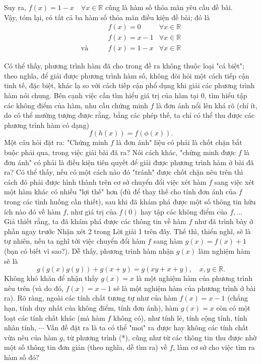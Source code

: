 \begin{bt}
{\begin{itemize}
			Suy ra, $f(x)=1-x \quad \forall x \in \mathbb{R}$ cũng là hàm số thỏa mãn yêu cầu đề bài.\\
			Vậy, tóm lại, có tất cả ba hàm số thỏa mãn điều kiện đề bài; đó là
			\begin{align*}
				&f(x)=0 &\forall x \in \mathbb{R} \\ 
				&f(x)=x-1 &\forall x \in \mathbb{R} \\ 
				\text{và}\qquad &f(x)=1-x &\forall x \in \mathbb{R}
			\end{align*}
		\end{itemize}
		Có thể thấy, phương trình hàm đã cho trong đề ra không thuộc loại "cá biệt"; theo nghĩa, để giải được phương trình hàm số, không đòi hỏi một cách tiếp cận tinh tế, đặc biệt, khác lạ so với cách tiếp cận phổ dụng khi giải các phương trình hàm nói chung. Bên cạnh việc cần tìm hiểu giá trị của hàm tại $0$, tìm hiểu tập các không điểm của hàm, nhu cầu chứng minh $f$ là đơn ánh nổi lên khá rõ (chí ít, do có thể mường tượng được rằng, bằng các phép thế, ta chỉ có thể thu được các phương trình hàm có dạng)
		$$ f(h(x))=f(\phi (x)).$$
		Một câu hỏi đặt ra: "Chứng minh $f$ là đơn ánh" liệu có phải là chốt chặn bắt buộc phải qua, trong việc giải bài đã ra? Nói cách khác, "chứng minh được $f$ là đơn ánh" có phải là điều kiện tiên quyết để giải được phương trình hàm ở bài đã ra?
		Có thể thấy, nếu có một cách nào đó "tránh" được chốt chặn nêu trên thì cách đó phải được hình thành trên cơ sở chuyển đổi việc xét hàm $f$ sang việc xét một hàm khác có nhiều "lợi thế" hơn (đủ để thay thế cho tính đơn ánh của $f$ trong các tình huống cần thiết), sau khi đã khám phá được một số thông tin hữu ích nào đó về hàm $f$, như giá trị của $f(0)$ hay tập các không điểm của $f, \ldots$\\
		Giả thiết rằng, ta đã khám phá được các thông tin về hàm $f$ như đã trình bày ở phần ngay trước Nhận xét 2 trong Lời giải 1 trên đây. Thế thì, thiển nghĩ, sẽ là tự nhiên, nếu ta nghĩ tới việc chuyển đổi hàm $f$ sang hàm $g(x)=f(x)+1$ (bạn có biết vì sao?). Dễ thấy, phương trình hàm nhận $g(x)$ làm nghiệm hàm sẽ là
		$$ g(g(x)g(y))+g(x+y)=g(xy+x+y),  \quad x,y \in \mathbb{R}. $$
		Không khó khăn để nhận thấy $g(x)=x$ là một nghiệm hàm của phương trình nêu trên (và do đó, $f(x)=x-1$ sẽ là một nghiệm hàm của phương trình ở bài ra).
		Rõ ràng, ngoài các tính chất tương tự như của hàm $f(x)=x-1$ (chẳng hạn, tính duy nhất của không điểm, tính đơn ánh), hàm $g(x)=x$ còn có một loạt các tính chất khác (mà hàm $f$ không có), như tính lẻ, tính cộng tính, tính nhân tính, $\cdots$ Vấn đề đặt ra là ta có thể "moi" ra được hay không các tính chất vừa nêu của hàm $g$, từ phương trình (*), cũng như từ các thông tin thu được nhờ một số thông tin đơn giản (theo nghĩa, dễ tìm ra) về $f$, làm cơ sở cho việc tìm ra hàm số đó?\\
}
\end{bt}
